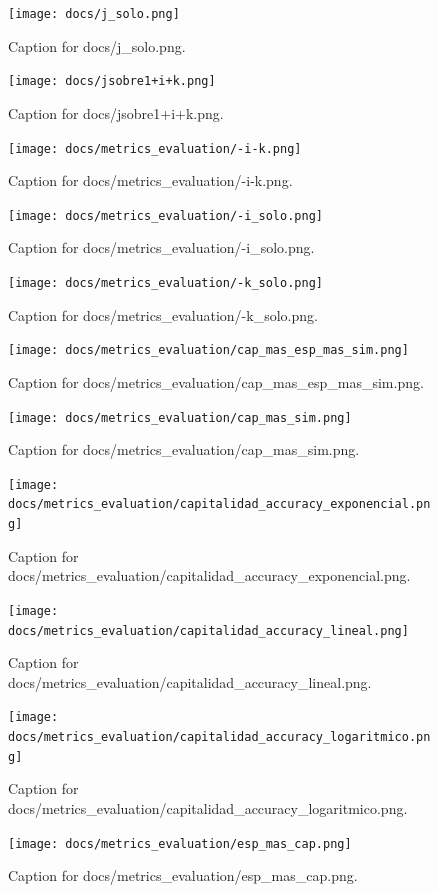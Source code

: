 \documentclass{article}
\begin{document}
\begin{figure}[h] \centering \texttt{[image: docs/j\_solo.png]} \caption{Caption for docs/j_solo.png.} \end{figure}
\begin{figure}[h] \centering \texttt{[image: docs/jsobre1+i+k.png]} \caption{Caption for docs/jsobre1+i+k.png.} \end{figure}
\begin{figure}[h] \centering \texttt{[image: docs/metrics\_evaluation/-i-k.png]} \caption{Caption for docs/metrics_evaluation/-i-k.png.} \end{figure}
\begin{figure}[h] \centering \texttt{[image: docs/metrics\_evaluation/-i\_solo.png]} \caption{Caption for docs/metrics_evaluation/-i_solo.png.} \end{figure}
\begin{figure}[h] \centering \texttt{[image: docs/metrics\_evaluation/-k\_solo.png]} \caption{Caption for docs/metrics_evaluation/-k_solo.png.} \end{figure}
\begin{figure}[h] \centering \texttt{[image: docs/metrics\_evaluation/cap\_mas\_esp\_mas\_sim.png]} \caption{Caption for docs/metrics_evaluation/cap_mas_esp_mas_sim.png.} \end{figure}
\begin{figure}[h] \centering \texttt{[image: docs/metrics\_evaluation/cap\_mas\_sim.png]} \caption{Caption for docs/metrics_evaluation/cap_mas_sim.png.} \end{figure}
\begin{figure}[h] \centering \texttt{[image: docs/metrics\_evaluation/capitalidad\_accuracy\_exponencial.png]} \caption{Caption for docs/metrics_evaluation/capitalidad_accuracy_exponencial.png.} \end{figure}
\begin{figure}[h] \centering \texttt{[image: docs/metrics\_evaluation/capitalidad\_accuracy\_lineal.png]} \caption{Caption for docs/metrics_evaluation/capitalidad_accuracy_lineal.png.} \end{figure}
\begin{figure}[h] \centering \texttt{[image: docs/metrics\_evaluation/capitalidad\_accuracy\_logaritmico.png]} \caption{Caption for docs/metrics_evaluation/capitalidad_accuracy_logaritmico.png.} \end{figure}
\begin{figure}[h] \centering \texttt{[image: docs/metrics\_evaluation/esp\_mas\_cap.png]} \caption{Caption for docs/metrics_evaluation/esp_mas_cap.png.} \end{figure}
\end{document}
